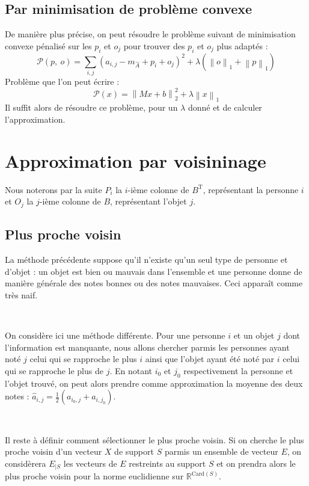 \documentclass[10pt, a4paper]{article}
\newcommand{\B}{B} %
\newcommand{\Ap}{\widehat{A}} %
\newcommand{\Ac}[2]{a_{#1,#2}} %
\newcommand{\Apc}[2]{\widehat{a}_{#1,#2}} %
\newcommand{\norme}[2]{\left\lVert #1 \right\rVert_{#2}} %
\newcommand{\tr}[1]{#1^{\mathrm{T}}} %
\newcommand{\pp}[1]{\left(#1\right)} %
\newcommand{\nl}{

~

} %
\begin{document}
\subsection{Par minimisation de problème convexe}

De manière plus précise, on peut résoudre le problème suivant de minimisation convexe pénalisé sur les $p_i$ et $o_j$ pour trouver des $p_i$ et $o_j$ plus adaptés : \[
	\mathcal{P}\pp{p,\:o} = \sum_{i,j} \pp{\Ac{i}{j} - m_{\Ap} + p_i + o_j}^2 + \lambda\pp{\norme{o}{1} + \norme{p}{1}}
\]
Problème que l'on peut écrire : \[
	\mathcal{P}\pp{x} = \norme{Mx + b}{2}^2 + \lambda\norme{x}{1}
\]
Il suffit alors de résoudre ce problème, pour un $\lambda$ donné et de calculer l'approximation.

\section{Approximation par voisininage}

Nous noterons par la suite $P_i$ la $i$-ième colonne de $\tr{B}$, représentant la personne $i$ et $O_j$ la $j$-ième colonne de $\B$, représentant l'objet $j$.

\subsection{Plus proche voisin}

La méthode précédente suppose qu'il n'existe qu'un seul type de personne et d'objet : un objet est bien ou mauvais dans l'ensemble et une personne donne de manière générale des notes bonnes ou des notes mauvaises. Ceci apparaît comme très naif.
\nl

On considère ici une méthode différente. Pour une personne $i$ et un objet $j$ dont l'information est manquante, nous allons chercher parmis les personnes ayant noté $j$ celui qui se rapproche le plus $i$ ainsi que l'objet ayant été noté par $i$ celui qui se rapproche le plus de $j$. En notant $i_0$ et $j_0$ respectivement la personne et l'objet trouvé, on peut alors prendre comme approximation la moyenne des deux notes : $\Apc{i}{j} = \frac{1}{2}\pp{\Ac{i_0}{j} + \Ac{i}{j_0}}$.

\nl
Il reste à définir comment sélectionner le plus proche voisin. Si on cherche le plus proche voisin d'un vecteur $X$ de support $S$ parmis un ensemble de vecteur $E$, on considèrera $E_{|S}$ les vecteurs de $E$ restreints au support $S$ et on prendra alors le plus proche voisin pour la norme euclidienne sur $\mathbb{R}^{\mathrm{Card}\pp{S}}$.
\end{document}
